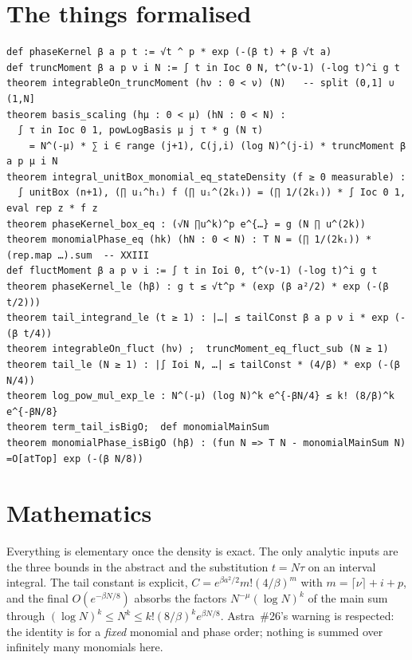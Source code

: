 \documentclass[11pt]{article}
\begin{document}
\section{The things formalised}
{\small
\begin{verbatim}
def phaseKernel β a p t := √t ^ p * exp (-(β t) + β √t a)
def truncMoment β a p ν i N := ∫ t in Ioc 0 N, t^(ν-1) (-log t)^i g t
theorem integrableOn_truncMoment (hν : 0 < ν) (N)   -- split (0,1] ∪ (1,N]
theorem basis_scaling (hμ : 0 < μ) (hN : 0 < N) :
  ∫ τ in Ioc 0 1, powLogBasis μ j τ * g (N τ)
    = N^(-μ) * ∑ i ∈ range (j+1), C(j,i) (log N)^(j-i) * truncMoment β a p μ i N
theorem integral_unitBox_monomial_eq_stateDensity (f ≥ 0 measurable) :
  ∫ unitBox (n+1), (∏ uᵢ^hᵢ) f (∏ uᵢ^(2kᵢ)) = (∏ 1/(2kᵢ)) * ∫ Ioc 0 1, eval rep z * f z
theorem phaseKernel_box_eq : (√N ∏u^k)^p e^{…} = g (N ∏ u^(2k))
theorem monomialPhase_eq (hk) (hN : 0 < N) : T N = (∏ 1/(2kᵢ)) * (rep.map …).sum  -- XXIII
def fluctMoment β a p ν i := ∫ t in Ioi 0, t^(ν-1) (-log t)^i g t
theorem phaseKernel_le (hβ) : g t ≤ √t^p * (exp (β a²/2) * exp (-(β t/2)))
theorem tail_integrand_le (t ≥ 1) : |…| ≤ tailConst β a p ν i * exp (-(β t/4))
theorem integrableOn_fluct (hν) ;  truncMoment_eq_fluct_sub (N ≥ 1)
theorem tail_le (N ≥ 1) : |∫ Ioi N, …| ≤ tailConst * (4/β) * exp (-(β N/4))
theorem log_pow_mul_exp_le : N^(-μ) (log N)^k e^{-βN/4} ≤ k! (8/β)^k e^{-βN/8}
theorem term_tail_isBigO;  def monomialMainSum
theorem monomialPhase_isBigO (hβ) : (fun N => T N - monomialMainSum N) =O[atTop] exp (-(β N/8))
\end{verbatim}
}

\section{Mathematics}
Everything is elementary once the density is exact. The only analytic inputs are the three bounds in
the abstract and the substitution $t=N\tau$ on an interval integral. The tail constant is explicit,
$C=e^{\beta a^2/2}m!(4/\beta)^m$ with $m=\lceil\nu\rceil+i+p$, and the final $O(e^{-\beta N/8})$
absorbs the factors $N^{-\mu}(\log N)^k$ of the main sum through $(\log N)^k\le N^k\le k!(8/\beta)^k
e^{\beta N/8}$. Astra~\#26's warning is respected: the identity is for a \emph{fixed} monomial and
phase order; nothing is summed over infinitely many monomials here.
\end{document}
